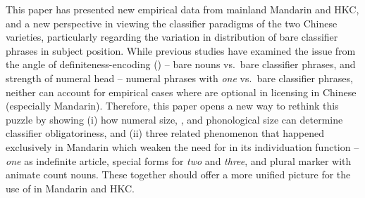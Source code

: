 \documentclass[output=paper]{langsci/langscibook}
\begin{document}
This paper has presented new empirical data from mainland Mandarin and \gls{HKC}, and a new perspective in viewing the
classifier paradigms of the two Chinese varieties, particularly
regarding the variation in distribution of bare classifier phrases in subject
position. While previous studies have examined the issue from the angle of
definiteness-encoding (\citealt{ChengSybesma1999}) -- bare nouns vs.\ bare
classifier phrases, and strength of numeral head
\citep{Huang2015} -- numeral phrases with \emph{one} vs.\ bare classifier
phrases, neither can account for empirical cases where  are
optional in licensing  in Chinese (especially Mandarin). Therefore,
this paper opens a new way to rethink this puzzle by showing (i) how numeral
size, , and phonological size can determine classifier
obligatoriness, and (ii) three related phenomenon that happened exclusively in
Mandarin which weaken the need for  in
its individuation function -- \emph{one} as indefinite article, special forms
for \emph{two} and \emph{three}, and plural marker with animate count nouns.
These together should offer a more unified picture for the use of
 in Mandarin and \gls{HKC}.

\printchapterglossary{}

{\sloppy\printbibliography[heading=subbibliography,notkeyword=this]}
\end{document}
